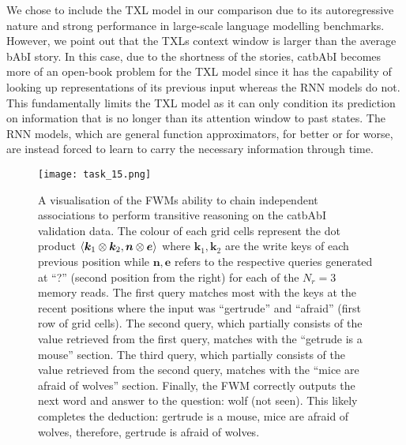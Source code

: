 \documentclass{article} \usepackage{iclr2021_conference,times}
\def\ve{{\bm{e}}}
\def\vk{{\bm{k}}}
\def\vn{{\bm{n}}}
\begin{document}
We chose to include the TXL model in our comparison due to its autoregressive nature and strong performance in large-scale language modelling benchmarks.
However, we point out that the TXLs context window is larger than the average bAbI story.
In this case, due to the shortness of the stories, catbAbI becomes more of an open-book problem for the TXL model since it has the capability of looking up representations of its previous input whereas the RNN models do not.
This fundamentally limits the TXL model as it can only condition its prediction on information that is no longer than its attention window to past states.
The RNN models, which are general function approximators, for better or for worse, are instead forced to learn to carry the necessary information through time. 
\begin{figure}[!ht]
  \centering
\texttt{[image: task\_15.png]}
  \vspace{-3pt}
  \caption{
  A visualisation of the FWMs ability to chain independent associations to perform transitive reasoning on the catbAbI validation data.
  The colour of each grid cells represent the dot product $\langle \vk_1 \protect\otimes \vk_2, \vn \protect\otimes \ve \rangle$ where $\vk_1,\vk_2$ are the write keys of each previous position while $\vn, \ve$ refers to the respective queries generated at ``?'' (second position from the right) for each of the $N_r=3$ memory reads.
  The first query matches most with the keys at the recent positions where the input was ``gertrude'' and ``afraid'' (first row of grid cells). 
  The second query, which partially consists of the value retrieved from the first query, matches with the ``getrude is a mouse'' section.
  The third query, which partially consists of the value retrieved from the second query, matches with the ``mice are afraid of wolves'' section.
  Finally, the FWM correctly outputs the next word and answer to the question: wolf (not seen).
  This likely completes the deduction: gertrude is a mouse, mice are afraid of wolves, therefore, gertrude is afraid of wolves.}
  \vspace{-5pt}
  \label{fig:task15}
\end{figure}
\end{document}
